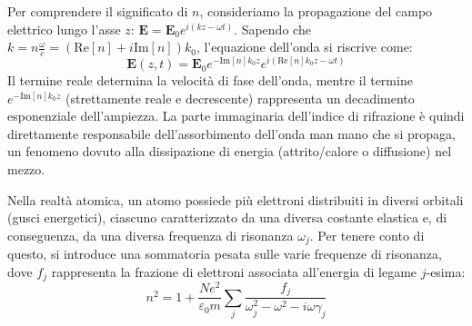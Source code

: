 \documentclass[openany,a4paper,12pt]{book}
\begin{document}
\begin{figure}[H]
\end{figure}

Per comprendere il significato di $n$, consideriamo la propagazione del campo elettrico lungo l'asse $z$: $\mathbf{E} = \mathbf{E}_0 e^{i(k z - \omega t)}$. Sapendo che $k = n \frac{\omega}{c} = (\text{Re}[n] + i \text{Im}[n]) k_0$, l'equazione dell'onda si riscrive come:
\begin{equation}
    \mathbf{E}(z,t) = \mathbf{E}_0 e^{- \text{Im}[n] k_0 z} e^{i(\text{Re}[n] k_0 z - \omega t)}
\end{equation}
Il termine reale determina la velocità di fase dell'onda, mentre il termine $e^{- \text{Im}[n] k_0 z}$ (strettamente reale e decrescente) rappresenta un decadimento esponenziale dell'ampiezza. La parte immaginaria dell'indice di rifrazione è quindi direttamente responsabile dell'assorbimento dell'onda man mano che si propaga, un fenomeno dovuto alla dissipazione di energia (attrito/calore o diffusione) nel mezzo.

Nella realtà atomica, un atomo possiede più elettroni distribuiti in diversi orbitali (gusci energetici), ciascuno caratterizzato da una diversa costante elastica e, di conseguenza, da una diversa frequenza di risonanza $\omega_j$. 
Per tenere conto di questo, si introduce una sommatoria pesata sulle varie frequenze di risonanza, dove $f_j$ rappresenta la frazione di elettroni associata all'energia di legame $j$-esima:
\begin{equation}
        n^2 = 1 + \frac{N e^2}{\varepsilon_0 m} \sum_{j}  \frac{f_j}{\omega_j^2 - \omega^2 - i\omega \gamma_j}
\end{equation}
\end{document}

